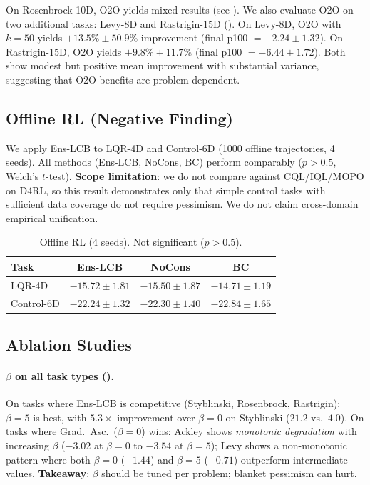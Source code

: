 \documentclass{article}
\theoremstyle{plain}
\theoremstyle{remark}
\newcommand{\method}{Ens-LCB}
\begin{document}
On Rosenbrock-10D, O2O yields mixed results (see ).
We also evaluate O2O on two additional tasks: Levy-8D and Rastrigin-15D ().
On Levy-8D, O2O with $k{=}50$ yields $+13.5\% \pm 50.9\%$ improvement (final p100 $= -2.24 \pm 1.32$).
On Rastrigin-15D, O2O yields $+9.8\% \pm 11.7\%$ (final p100 $= -6.44 \pm 1.72$).
Both show modest but positive mean improvement with substantial variance, suggesting that O2O benefits are problem-dependent.

\subsection{Offline RL (Negative Finding)}
\label{sec:exp_rl}

We apply \method{} to LQR-4D and Control-6D (1000 offline trajectories, 4 seeds).
All methods (\method{}, NoCons, BC) perform comparably ($p > 0.5$, Welch's $t$-test).
\textbf{Scope limitation}: we do not compare against CQL/IQL/MOPO on D4RL, so this result demonstrates only that simple control tasks with sufficient data coverage do not require pessimism.
We do not claim cross-domain empirical unification.

\begin{table}[t]
  \caption{Offline RL (4 seeds). Not significant ($p > 0.5$).}
  \label{tab:rl}
  \begin{center}
    \begin{small}
      \begin{tabular}{lccc}
        \toprule
        Task & \method{} & NoCons & BC \\
        \midrule
        LQR-4D     & $-15.72 \pm 1.81$ & $-15.50 \pm 1.87$ & $\mathbf{-14.71 \pm 1.19}$ \\
        Control-6D & $-22.24 \pm 1.32$ & $-22.30 \pm 1.40$ & $-22.84 \pm 1.65$ \\
        \bottomrule
      \end{tabular}
    \end{small}
  \end{center}
  \vskip -0.1in
\end{table}

\subsection{Ablation Studies}
\label{sec:ablation}

\paragraph{$\beta$ on all task types ().}
On tasks where \method{} is competitive (Styblinski, Rosenbrock, Rastrigin): $\beta{=}5$ is best, with $5.3\times$ improvement over $\beta{=}0$ on Styblinski ($21.2$ vs.\ $4.0$).
On tasks where Grad.\ Asc.\ ($\beta{=}0$) wins: Ackley shows \emph{monotonic degradation} with increasing $\beta$ ($-3.02$ at $\beta{=}0$ to $-3.54$ at $\beta{=}5$); Levy shows a non-monotonic pattern where both $\beta{=}0$ ($-1.44$) and $\beta{=}5$ ($-0.71$) outperform intermediate values.
\textbf{Takeaway}: $\beta$ should be tuned per problem; blanket pessimism can hurt.
\end{document}
